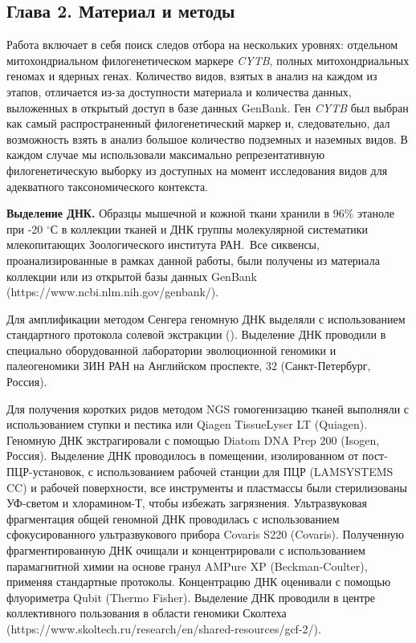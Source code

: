 \subsection*{Глава 2. Материал и методы}

Работа включает в себя поиск следов отбора на нескольких уровнях: отдельном митохондриальном филогенетическом маркере \textit{CYTB}, полных митохондриальных геномах и ядерных генах. Количество видов, взятых в анализ на каждом из этапов, отличается из-за доступности материала и количества данных, выложенных в открытый доступ в базе данных GenBank. Ген \textit{CYTB} был выбран как самый распространенный филогенетический маркер и, следовательно, дал возможность взять в анализ большое количество подземных и наземных видов. В каждом случае мы использовали максимально репрезентативную филогенетическую выборку из доступных на момент исследования видов для адекватного таксономического контекста.

\textbf{Выделение ДНК.} Образцы мышечной и кожной ткани хранили в 96\% этаноле при -20 $^\circ$С в коллекции тканей и ДНК группы молекулярной систематики млекопитающих Зоологического института РАН. Все сиквенсы, проанализированные в рамках данной работы, были получены из материала коллекции или из открытой базы данных GenBank (https://www.ncbi.nlm.nih.gov/genbank/). 

Для амплификации методом Сенгера геномную ДНК выделяли с использованием стандартного протокола солевой экстракции (\cite{Miller1999}). Выделение ДНК проводили в специально оборудованной лаборатории эволюционной геномики и палеогеномики ЗИН РАН на Английском проспекте, 32 (Санкт-Петербург, Россия).

Для получения коротких ридов методом NGS гомогенизацию тканей выполняли с использованием ступки и пестика или Qiagen TissueLyser LT (Quiagen). Геномную ДНК экстрагировали с помощью Diatom DNA Prep 200 (Isogen, Россия). Выделение ДНК проводилось в помещении, изолированном от пост-ПЦР-установок, с использованием рабочей станции для ПЦР (LAMSYSTEMS CC) и рабочей поверхности, все инструменты и пластмассы были стерилизованы УФ-светом и хлорамином-Т, чтобы избежать загрязнения. Ультразвуковая фрагментация общей геномной ДНК проводилась с использованием сфокусированного ультразвукового прибора Covaris S220 (Covaris). Полученную фрагментированную ДНК очищали и концентрировали с использованием парамагнитной химии на основе гранул AMPure XP (Beckman-Coulter), применяя стандартные протоколы. Концентрацию ДНК оценивали с помощью флуориметра Qubit (Thermo Fisher). Выделение ДНК проводили в центре коллективного пользования в области геномики Сколтеха (https://www.skoltech.ru/research/en/shared-resources/gcf-2/).

